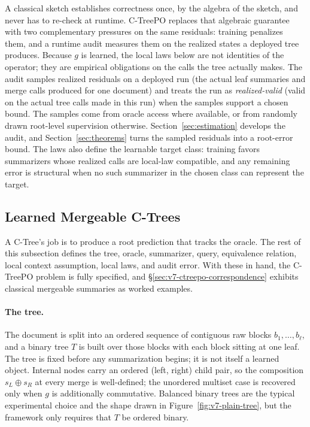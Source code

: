 A classical sketch establishes correctness once, by the algebra of the
sketch, and never has to re-check at runtime. C-TreePO replaces that
algebraic guarantee with two complementary pressures on the same
residuals: training penalizes them, and a runtime audit measures them
on the realized states a deployed tree produces. Because \(g\) is
learned, the local laws below are not identities of the operator; they
are empirical obligations on the calls the tree actually makes. The audit samples
realized residuals on a deployed run (the actual leaf summaries and
merge calls produced for one document) and treats the run as
\emph{realized-valid} (valid on the actual tree calls made in this run)
when the samples support a chosen bound. The
samples come from oracle access where available, or from randomly
drawn root-level supervision otherwise.
Section~\ref{sec:estimation} develops the audit, and
Section~\ref{sec:theorems} turns the sampled residuals into a
root-error bound. The laws also define the learnable target class:
training favors summarizers whose realized calls are local-law
compatible, and any remaining error is structural when no such
summarizer in the chosen class can represent the target.

\subsection{Learned Mergeable C-Trees}
\label{sec:v7-ctreepo-state-machine}

A C-Tree's job is to produce a root prediction that tracks the
oracle. The rest of this subsection defines the tree, oracle,
summarizer, query, equivalence relation, local context assumption,
local laws, and audit error. With these in hand, the C-TreePO problem
is fully specified, and \S\ref{sec:v7-ctreepo-correspondence}
exhibits classical mergeable summaries as worked examples.

\paragraph{The tree.}
The document is split into an ordered sequence of contiguous raw
blocks \(b_1,\dots,b_\ell\), and a binary tree \(T\) is built over
those blocks with each block sitting at one leaf. The tree is fixed
before any summarization begins; it is not itself a learned object.
Internal nodes carry an ordered (left, right) child pair, so the
composition \(s_L\oplus s_R\) at every merge is well-defined; the
unordered multiset case is recovered only when \(g\) is additionally
commutative. Balanced binary trees are the typical experimental
choice and the shape drawn in Figure~\ref{fig:v7-plain-tree}, but
the framework only requires that \(T\) be ordered binary.

